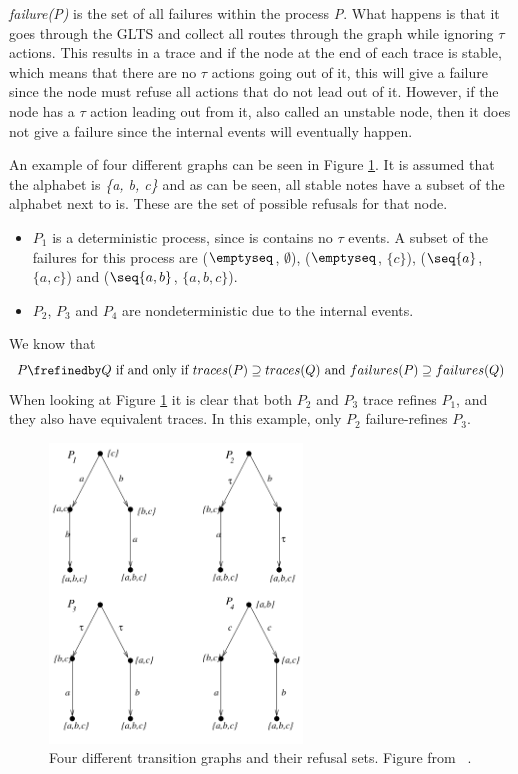 \textit{failure(P)} is the set of all failures within the process \textit{P}. What happens is that it goes through the GLTS and collect all routes through the graph while ignoring $\tau$ actions. This results in a trace and if the node at the end of each trace is stable, which means that there are no $\tau$ actions going out of it, this will give a failure since the node must refuse all actions that do not lead out of it. However, if the node has a $\tau$ action leading out from it, also called an unstable node, then it does not give a failure since the internal events will eventually happen.

An example of four different graphs can be seen in Figure \ref{fig:failures_graph}. It is assumed that the alphabet is \textit{\{a, b, c\}} and as can be seen, all stable notes have a subset of the alphabet next to is. These are the set of possible refusals for that node.
\begin{itemize}
    \item $P_1$ is a deterministic process, since is contains no $\tau$ events. A subset of the failures for this process are ($\emptyseq$, $\emptyset$), ($\emptyseq$, $\{c\}$), ($\seq{a}$, $\{a,c\}$) and ($\seq{a,b}$, $\{a,b,c\}$).
    \item $P_2$, $P_3$ and $P_4$ are nondeterministic due to the internal events.
\end{itemize}
We know that $$P \frefinedby Q \text{ if and only if } traces(P) \supseteq traces(Q) \text{ and } failures(P) \supseteq failures(Q)$$
When looking at Figure \ref{fig:failures_graph} it is clear that both $P_2$ and $P_3$ trace refines $P_1$, and they also have equivalent traces. In this example, only $P_2$ failure-refines $P_3$.
\begin{figure}[h]
\centering
\includegraphics[width=0.6\textwidth]{figures/failures_graph.jpg}
\caption{Four different transition graphs and their refusal sets. Figure from ~\cite{Roscoe2010}.}
\label{fig:failures_graph}
\end{figure}
